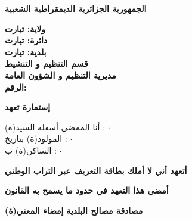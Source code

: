 \documentclass[a4paper,12pt]{article}
\newcommand{\englishnumbers}[1]{\textLR{\textbf{#1}}}
\newcommand{\dottedline}{\leavevmode\leaders\hbox{$\cdot$}\hfill\kern0pt}
\begin{document}
\begin{center}
    \fontsize{20}{22}\selectfont \textbf{الجمهورية الجزائرية الديمقراطية الشعبية}
\end{center}

\vspace{0.3cm}

\begin{flushright}
    \fontsize{16}{18}\selectfont 
    \textbf{ولاية: تيارت}  \\
    \vspace{0.3cm}
    \textbf{دائرة: تيارت} \\
    \vspace{0.3cm}
    \textbf{بلدية: تيارت} \\
    \vspace{0.3cm}
    \textbf{قسم التنظيم و التنشيط} \\
    \vspace{0.3cm}
    \textbf{مديرية التنظيم و الشؤون العامة} \\
    \vspace{0.3cm}
    \textbf{الرقم: \englishnumbers{5}} \\
\end{flushright}

\vspace{0.2cm}

\begin{center}
    \fontsize{40}{42}\selectfont \textbf{إستمارة تعهد}
\end{center}

\vspace{0.5cm}

\begin{flushright}
    \fontsize{16}{18}\selectfont 
    أنا الممضي أسفله السيد(ة) : \dottedline \\
    \vspace{1cm}
    المولود(ة) بتاريخ : \dottedline \\
    \vspace{1cm} 
    الساكن(ة) ب : \dottedline \\
\end{flushright}

\vspace{1cm}

\begin{flushright}
    \hspace{1cm} %
    \fontsize{18}{20}\selectfont \textbf{أتعهد أني لا أملك بطاقة التعريف عبر التراب الوطني}
    \hspace{1cm} %
\end{flushright}

\vspace{0.5cm}

\begin{center}
    \fontsize{18}{20}\selectfont \textbf{أمضي هذا التعهد في حدود ما يسمح به القانون}
\end{center}

\vspace{1.5cm}

\noindent
\fontsize{16}{18}\selectfont \textbf{مصادقة مصالح البلدية}
\hfill
\fontsize{16}{18}\selectfont \textbf{إمضاء المعني(ة)}
\end{document}
